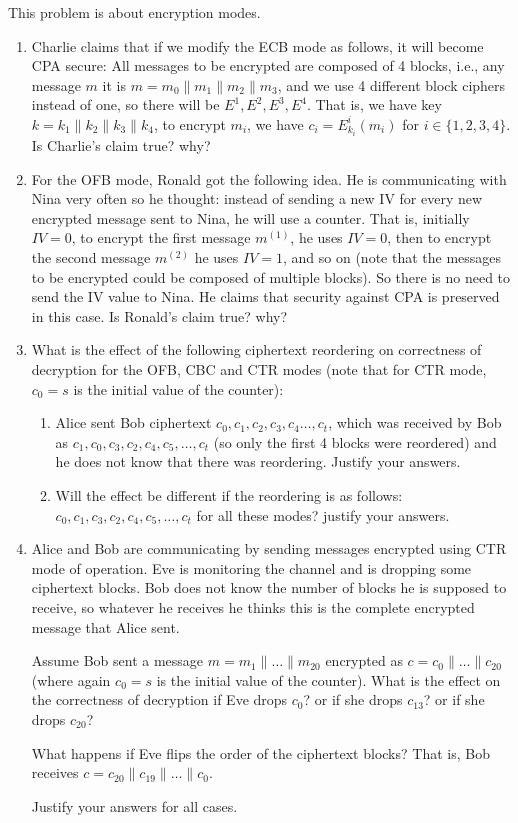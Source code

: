 \documentclass[12pt]{article}
\newcommand*\concat{\mathbin{\|}}
\begin{document}
This problem is about encryption modes.
\begin{enumerate}
\item Charlie claims that if we modify the ECB mode as follows, it will become CPA secure: All messages to be encrypted are composed of 4 blocks, i.e., any message $m$ it is $m = m_0 \concat m_1 \concat m_2 \concat m_3$, and we use 4 different block ciphers instead of one, so there will be $E^1, E^2, E^3, E^4$. That is, we have key $k = k_1 \concat k_2 \concat k_3 \concat k_4$, to encrypt $m_i$, we have $c_i = E^i_{k_i}(m_i)$ for $i \in \{1, 2, 3, 4\}$. Is Charlie's claim true? why? 

\item For the OFB mode, Ronald got the following idea. He is communicating with Nina very often so he thought: instead of sending a new IV for every new encrypted message sent to Nina, he will use a counter. That is, initially $IV = 0$, to encrypt the first message $m^{(1)}$, he uses $IV = 0$, then to encrypt the second message $m^{(2)}$ he uses $IV = 1$, and so on (note that the messages to be encrypted could be composed of multiple blocks). So there is no need to send the IV value to Nina. He claims that security against CPA is preserved in this case. Is Ronald's claim true? why? 

\item What is the effect of the following ciphertext reordering on correctness of decryption for the OFB, CBC and CTR modes (note that for CTR mode, $c_0 = s$ is the initial value of the counter): 
\begin{enumerate}
    \item Alice sent Bob ciphertext $c_0, c_1, c_2, c_3, c_4 \dots, c_t$, which was received by Bob as $c_1, c_0, c_3, c_2, c_4, c_5, \dots, c_t$ (so only the first 4 blocks were reordered) and he does not know that there was reordering. Justify your answers. 

    \item Will the effect be different if the reordering is as follows: $c_0, c_1, c_3, c_2, c_4, c_5, \dots, c_t$ for all these modes? justify your answers.
\end{enumerate} 

\item Alice and Bob are communicating by sending messages encrypted using CTR mode of operation. Eve is monitoring the channel and is dropping some ciphertext blocks. Bob does not know the number of blocks he is supposed to receive, so whatever he receives he thinks this is the complete encrypted message that Alice sent.

Assume Bob sent a message $m = m_1 \concat \dots \concat m_{20}$ encrypted as $c = c_0 \concat \dots \concat c_{20}$ (where again $c_0 = s$ is the initial value of the counter). What is the effect on the correctness of decryption if Eve drops $c_0$? or if she drops $c_{13}$? or if she drops $c_{20}$?

What happens if Eve flips the order of the ciphertext blocks? That is, Bob receives $c = c_{20} \concat c_{19} \concat \dots \concat c_0$.

Justify your answers for all cases.
\end{enumerate}
\end{document}
